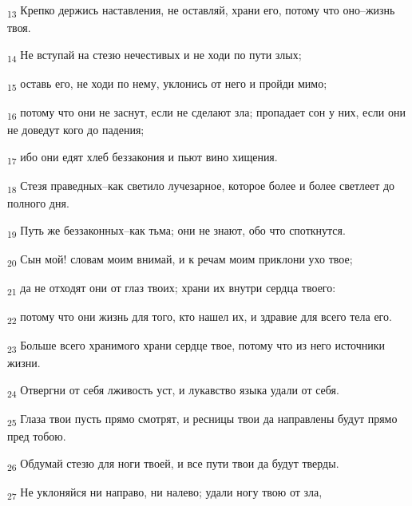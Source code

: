 \begin{tcolorbox}
\textsubscript{13} Крепко держись наставления, не оставляй, храни его, потому что оно--жизнь твоя.
\end{tcolorbox}
\begin{tcolorbox}
\textsubscript{14} Не вступай на стезю нечестивых и не ходи по пути злых;
\end{tcolorbox}
\begin{tcolorbox}
\textsubscript{15} оставь его, не ходи по нему, уклонись от него и пройди мимо;
\end{tcolorbox}
\begin{tcolorbox}
\textsubscript{16} потому что они не заснут, если не сделают зла; пропадает сон у них, если они не доведут кого до падения;
\end{tcolorbox}
\begin{tcolorbox}
\textsubscript{17} ибо они едят хлеб беззакония и пьют вино хищения.
\end{tcolorbox}
\begin{tcolorbox}
\textsubscript{18} Стезя праведных--как светило лучезарное, которое более и более светлеет до полного дня.
\end{tcolorbox}
\begin{tcolorbox}
\textsubscript{19} Путь же беззаконных--как тьма; они не знают, обо что споткнутся.
\end{tcolorbox}
\begin{tcolorbox}
\textsubscript{20} Сын мой! словам моим внимай, и к речам моим приклони ухо твое;
\end{tcolorbox}
\begin{tcolorbox}
\textsubscript{21} да не отходят они от глаз твоих; храни их внутри сердца твоего:
\end{tcolorbox}
\begin{tcolorbox}
\textsubscript{22} потому что они жизнь для того, кто нашел их, и здравие для всего тела его.
\end{tcolorbox}
\begin{tcolorbox}
\textsubscript{23} Больше всего хранимого храни сердце твое, потому что из него источники жизни.
\end{tcolorbox}
\begin{tcolorbox}
\textsubscript{24} Отвергни от себя лживость уст, и лукавство языка удали от себя.
\end{tcolorbox}
\begin{tcolorbox}
\textsubscript{25} Глаза твои пусть прямо смотрят, и ресницы твои да направлены будут прямо пред тобою.
\end{tcolorbox}
\begin{tcolorbox}
\textsubscript{26} Обдумай стезю для ноги твоей, и все пути твои да будут тверды.
\end{tcolorbox}
\begin{tcolorbox}
\textsubscript{27} Не уклоняйся ни направо, ни налево; удали ногу твою от зла,
\end{tcolorbox}

